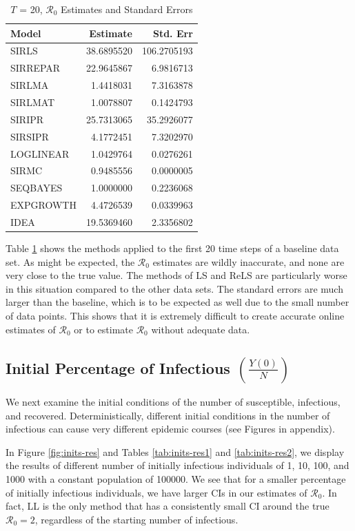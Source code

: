 \documentclass[12pt]{article}
\newcommand{\rr}{\ensuremath{\mathcal{R}_0}}
\begin{document}
\begin{table}[H]
  \centering
	\begin{tabular}[t]{l|r|r}
		\hline
		Model & Estimate & Std. Err\\
		\hline
		SIRLS & 38.6895520 & 106.2705193\\
		\hline
		SIRREPAR & 22.9645867 & 6.9816713\\
		\hline
		SIRLMA & 1.4418031 & 7.3163878\\
		\hline
		SIRLMAT & 1.0078807 & 0.1424793\\
		\hline
		SIRIPR & 25.7313065 & 35.2926077\\
		\hline
		SIRSIPR & 4.1772451 & 7.3202970\\
		\hline
		LOGLINEAR & 1.0429764 & 0.0276261\\
		\hline
		SIRMC & 0.9485556 & 0.0000005\\
		\hline
		SEQBAYES & 1.0000000 & 0.2236068\\
		\hline
		EXPGROWTH & 4.4726539 & 0.0339963\\
		\hline
		IDEA & 19.5369460 & 2.3356802\\
		\hline
	\end{tabular}
        \caption{ $T$ = 20, $\rr$ Estimates and Standard Errors}\label{tab:time-res2}
\end{table}

Table \ref{tab:time-res2} shows the methods applied to the first 20 time steps of a baseline data set. As might be expected, the $\rr$ estimates are wildly inaccurate, and none are very close to the true value. The methods of LS and ReLS are particularly worse in this situation compared to the other data sets. The standard errors are much larger than the baseline, which is to be expected as well due to the small number of data points. This shows that it is extremely difficult to create accurate online estimates of $\rr$ or to estimate $\rr$ without adequate data. 

\subsection{Initial Percentage of Infectious $\left (\frac{Y(0)}{N}\right)$}\label{sec:res-inf}
We next examine the initial conditions of the number of susceptible, infectious, and recovered.  Deterministically, different initial conditions in the number of infectious can cause very different epidemic courses (see Figures in appendix).

In Figure \ref{fig:inits-res} and Tables \ref{tab:inits-res1} and \ref{tab:inits-res2}, we display the results of different number of initially infectious individuals of 1, 10, 100, and 1000 with a constant population of 100000.  We see that for a smaller percentage of initially infectious individuals, we have larger CIs in our estimates of $\rr$.  In fact, LL is the only method that has a consistently small CI around the true $\rr=2$, regardless of the starting number of infectious.
\end{document}
